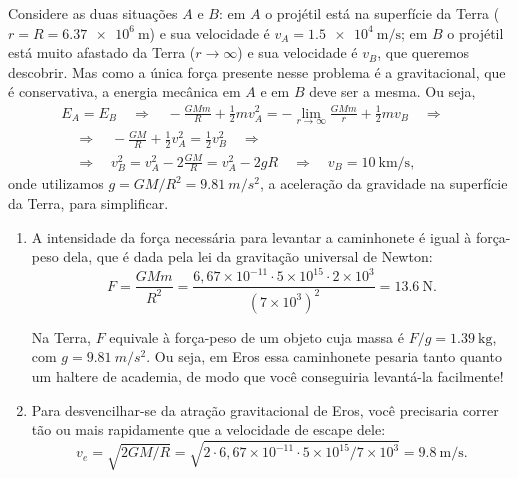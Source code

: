\documentclass[a4paper]{article}
\newcommand\myrightarrow{\quad\Rightarrow\quad}
\begin{document}
\begin{resolucoes}
  \begin{exercicio}
   Considere as duas situações $A$ e $B$: em $A$ o projétil está na superfície da Terra ($r = R = \SI{6.37e6}{\metre}$) e sua velocidade é $v_A = \SI{1.5e4}{\metre\per\second}$;
  em $B$ o projétil está muito afastado da Terra ($r \to \infty$) e sua velocidade é $v_B$, que queremos descobrir.
  Mas como a única força presente nesse problema é a gravitacional, que é conservativa, a energia mecânica em $A$ e em $B$ deve ser a mesma.
  Ou seja,
  \begin{gather*}
  E_A = E_B \myrightarrow -\frac{GMm}{R} + \frac{1}{2}mv_A^2 = -\lim_{r\to\infty}\frac{GMm}{r} + \frac{1}{2}mv_B \myrightarrow\\
  \myrightarrow -\frac{GM}{R} + \frac{1}{2}v_A^2 = \frac{1}{2}v_B^2 \myrightarrow\\
  \myrightarrow v_B^2 = v_A^2 - 2\frac{GM}{R} = v_A^2 - 2gR \myrightarrow v_B = \SI{10}{\kilo\metre\per\second},
  \end{gather*}
  onde utilizamos $g = GM/R^2 = \SI{9.81}{m/s^2}$, a aceleração da gravidade na superfície da Terra, para simplificar.
  \end{exercicio}
  
  \begin{exercicio}
  
  \begin{enumerate}
  \item A intensidade da força necessária para levantar a caminhonete é igual à força-peso dela, que é dada pela lei da gravitação universal de Newton:
  \begin{equation*}
  F = \frac{GMm}{R^2} = \frac{6,67\times10^{-11}\cdot 5\times10^{15}\cdot 2\times10^{3}}{\left(7\times10^{3}\right)^2} = \SI{13.6}{\newton}.
  \end{equation*}
  
  Na Terra, $F$ equivale à força-peso de um objeto cuja massa é $F/g = \SI{1.39}{\kilo\gram}$, com $g = \SI{9.81}{m/s^2}$.
  Ou seja, em Eros essa caminhonete pesaria tanto quanto um haltere de academia, de modo que você conseguiria levantá-la facilmente!
  
  \item Para desvencilhar-se da atração gravitacional de Eros, você precisaria correr tão ou mais rapidamente que a velocidade de escape dele:
  \begin{equation*}
  v_e = \sqrt{2GM/R} = \sqrt{{2\cdot 6,67\times10^{-11}\cdot 5\times10^{15}}/{7\times10^{3}}} = \SI{9.8}{\metre\per\second}.
  \end{equation*}
  

\end{enumerate}
\end{exercicio}
\end{resolucoes}
\end{document}
